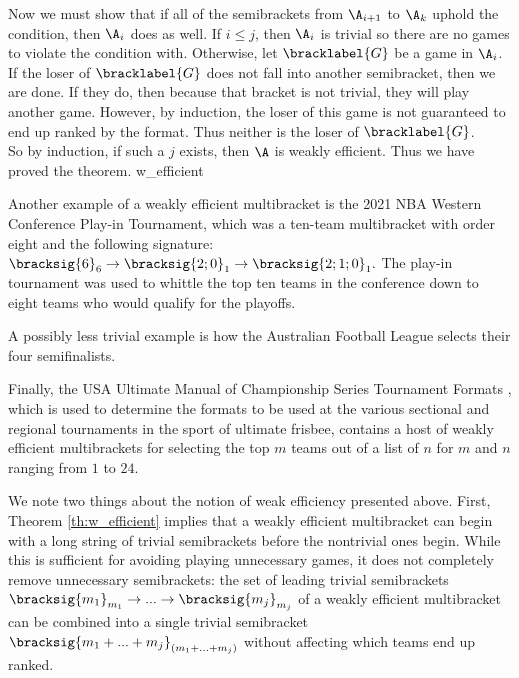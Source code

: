 {{        Now we must show that if all of the semibrackets from $\A_{i+1}$ to $\A_k$ uphold the condition, then $\A_i$ does as well. If $i \leq j$, then $\A_i$ is trivial so there are no games to violate the condition with. Otherwise, let $\bracklabel{G}$ be a game in $\A_i$. If the loser of $\bracklabel{G}$ does not fall into another semibracket, then we are done. If they do, then because that bracket is not trivial, they will play another game. However, by induction, the loser of this game is not guaranteed to end up ranked by the format. Thus neither is the loser of $\bracklabel{G}$.\\

        So by induction, if such a $j$ exists, then $\A$ is weakly efficient. Thus we have proved the theorem.
    }{w_efficient}

    Another example of a weakly efficient multibracket is the 2021 NBA Western Conference Play-in Tournament, which was a ten-team multibracket with order eight and the following signature:
    $\bracksig{6}_6 \to \bracksig{2;0}_1 \to \bracksig{2;1;0}_1.$ The play-in tournament was used to whittle the top ten teams in the conference down to eight teams who would qualify for the playoffs.


    A possibly less trivial example is how the Australian Football League selects their four semifinalists.


    Finally, the USA Ultimate Manual of Championship Series Tournament Formats \cite{ultimate}, which is used to determine the formats to be used at the various sectional and regional tournaments in the sport of ultimate frisbee, contains a host of weakly efficient multibrackets for selecting the top $m$ teams out of a list of $n$ for $m$ and $n$ ranging from $1$ to $24.$

    We note two things about the notion of weak efficiency presented above. First, Theorem \ref{th:w_efficient} implies that a weakly efficient multibracket can begin with a long string of trivial semibrackets before the nontrivial ones begin. While this is sufficient for avoiding playing unnecessary games, it does not completely remove unnecessary semibrackets: the set of leading trivial semibrackets $\bracksig{m_1}_{m_1} \to ... \to \bracksig{m_j}_{m_j}$ of a weakly efficient multibracket can be combined into a single trivial semibracket $\bracksig{m_1 + ... + m_j}_{(m_1 + ... + m_j)}$ without affecting which teams end up ranked.

}
